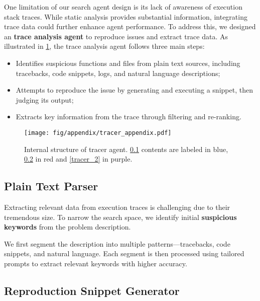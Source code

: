 One limitation of our search agent design is its lack of awareness of execution stack traces. While static analysis provides substantial information, integrating trace data could further enhance agent performance. To address this, we designed an \textbf{trace analysis  agent} to reproduce issues and extract trace data.
As illustrated in \cref{fig:tracer_appendix}, the trace analysis agent follows three main steps:

\begin{itemize} 
\item Identifies suspicious functions and files from plain text sources, including tracebacks, code snippets, logs, and natural language descriptions; 
\item Attempts to reproduce the issue by generating and executing a snippet, then judging its output; 
\item Extracts key information from the trace through filtering and re-ranking. 
\end{itemize}

\begin{figure}[ht]
    \centering
    \centerline{\texttt{[image: fig/appendix/tracer\_appendix.pdf]}}
    \caption{Internal structure of tracer agent. \cref{tracer_0} contents are labeled in blue, \ref{tracer_1} in red and \ref{tracer_2} in purple.}
    \label{fig:tracer_appendix}
    \vspace{-15pt}
\end{figure}

\subsection{Plain Text Parser} \label{tracer_0}

Extracting relevant data from execution traces is challenging due to their tremendous size. To narrow the search space, we identify initial \textbf{suspicious keywords} from the problem description.

We first segment the description into multiple patterns—tracebacks, code snippets, and natural language. Each segment is then processed using tailored prompts to extract relevant keywords with higher accuracy.

\subsection{Reproduction Snippet Generator} \label{tracer_1}

